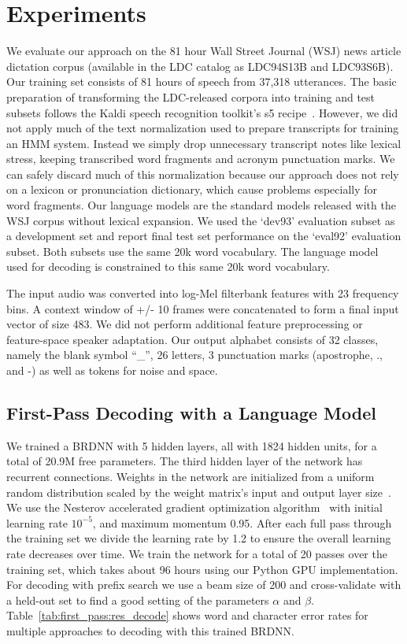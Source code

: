 \section{Experiments}

We evaluate our approach on the 81 hour Wall Street Journal (WSJ) news article
dictation corpus (available in the LDC catalog as LDC94S13B and LDC93S6B). Our
training set consists of 81 hours of speech from 37,318 utterances. The basic
preparation of transforming the LDC-released corpora into training and test
subsets follows the Kaldi speech recognition toolkit's s5
recipe~\cite{povey2011}. However, we did not apply much of the text
normalization used to prepare transcripts for training an HMM system. Instead
we simply drop unnecessary transcript notes like lexical stress, keeping
transcribed word fragments and acronym punctuation marks. We can safely discard
much of this normalization because our approach does not rely on a lexicon or
pronunciation dictionary, which cause problems especially for word fragments.
Our language models are the standard models released with the WSJ corpus
without lexical expansion. We used the `dev93' evaluation subset as a
development set and report final test set performance on the `eval92'
evaluation subset. Both subsets use the same 20k word vocabulary. The language
model used for decoding is constrained to this same 20k word vocabulary.

The input audio was converted into log-Mel filterbank features with 23
frequency bins. A context window of +/- 10 frames were concatenated to form a
final input vector of size 483. We did not perform additional feature
preprocessing or feature-space speaker adaptation.  Our output alphabet
consists of 32 classes, namely the blank symbol ``\_'', 26 letters, 3
punctuation marks (apostrophe, ., and -) as well as tokens for noise and space. 

\subsection{First-Pass Decoding with a Language Model}

We trained a BRDNN with 5 hidden layers, all with 1824 hidden units, for a
total of 20.9M free parameters. The third hidden layer of the network has
recurrent connections. Weights in the network are initialized from a uniform
random distribution scaled by the weight matrix's input and output layer
size~\cite{glorot2011}. We use the Nesterov accelerated gradient optimization
algorithm~\cite{sutskever2013} with initial learning rate $10^{-5}$, and
maximum momentum 0.95. After each full pass through the training set we divide
the learning rate by 1.2 to ensure the overall learning rate decreases over
time. We train the network for a total of 20 passes over the training set,
which takes about 96 hours using our Python GPU implementation.  For decoding
with prefix search we use a beam size of 200 and cross-validate with a held-out
set to find a good setting of the parameters $\alpha$ and $\beta$.
Table~\ref{tab:first_pass:res_decode} shows word and character error rates for
multiple approaches to decoding with this trained BRDNN.

